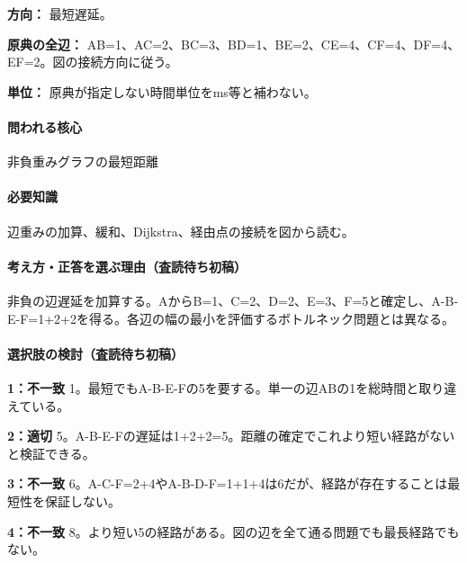 \noindent\textbf{方向：} 最短遅延。\par

\noindent\textbf{原典の全辺：} AB=\allowbreak{}1、AC=\allowbreak{}2、BC=\allowbreak{}3、BD=\allowbreak{}1、BE=\allowbreak{}2、CE=\allowbreak{}4、CF=\allowbreak{}4、DF=\allowbreak{}4、EF=\allowbreak{}2。図の接続方向に従う。\par

\noindent\textbf{単位：} 原典が指定しない時間単位をms等と補わない。\par

\paragraph{問われる核心} 非負重みグラフの最短距離

\paragraph{必要知識} 辺重みの加算、緩和、Dijkstra、経由点の接続を図から読む。

\paragraph{考え方・正答を選ぶ理由（査読待ち初稿）} 非負の辺遅延を加算する。AからB=\allowbreak{}1、C=\allowbreak{}2、D=\allowbreak{}2、E=\allowbreak{}3、F=\allowbreak{}5と確定し、A-B-E-F=\allowbreak{}1+2+2を得る。各辺の幅の最小を評価するボトルネック問題とは異なる。

\paragraph{選択肢の検討（査読待ち初稿）}\mbox{}\par

\noindent\textbf{1：不一致} 1。最短でもA-B-E-Fの5を要する。単一の辺ABの1を総時間と取り違えている。\par

\noindent\textbf{2：適切} 5。A-B-E-Fの遅延は1+2+2=\allowbreak{}5。距離の確定でこれより短い経路がないと検証できる。\par

\noindent\textbf{3：不一致} 6。A-C-F=\allowbreak{}2+4やA-B-D-F=\allowbreak{}1+1+4は6だが、経路が存在することは最短性を保証しない。\par

\noindent\textbf{4：不一致} 8。より短い5の経路がある。図の辺を全て通る問題でも最長経路でもない。\par

